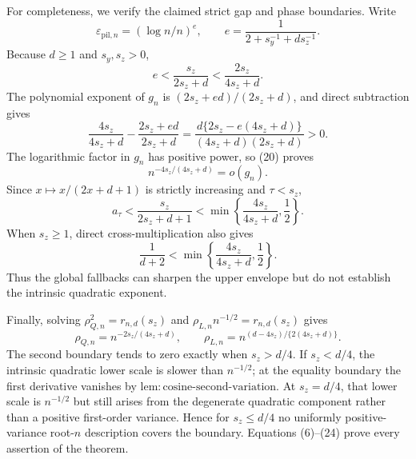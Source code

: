 For completeness, we verify the claimed strict gap and phase boundaries.  Write
\[
\varepsilon_{\mathrm{pil},n}=(\log n/n)^e,
\qquad
e=\frac{1}{2+s_y^{-1}+ds_z^{-1}}.
\]
Because \(d\ge1\) and \(s_y,s_z>0\),
\[
e<\frac{s_z}{2s_z+d}<\frac{2s_z}{4s_z+d}.                  \tag{19}
\]
The polynomial exponent of \(g_n\) is
\((2s_z+ed)/(2s_z+d)\), and direct subtraction gives
\[
\frac{4s_z}{4s_z+d}-\frac{2s_z+ed}{2s_z+d}
=\frac{d\{2s_z-e(4s_z+d)\}}
{(4s_z+d)(2s_z+d)}>0.                                       \tag{20}
\]
The logarithmic factor in \(g_n\) has positive power, so (20) proves
\[
n^{-4s_z/(4s_z+d)}=o(g_n).                                  \tag{21}
\]
Since \(x\mapsto x/(2x+d+1)\) is strictly increasing and \(\tau<s_z\),
\[
a_\tau<\frac{s_z}{2s_z+d+1}
<\min\left\{\frac{4s_z}{4s_z+d},\frac12\right\}.         \tag{22}
\]
When \(s_z\ge1\), direct cross-multiplication also gives
\[
\frac1{d+2}<\min\left\{\frac{4s_z}{4s_z+d},\frac12\right\}. \tag{23}
\]
Thus the global fallbacks can sharpen the upper envelope but do not establish the intrinsic quadratic exponent.

Finally, solving \(\rho_{Q,n}^2=r_{n,d}(s_z)\) and
\(\rho_{L,n}n^{-1/2}=r_{n,d}(s_z)\) gives
\[
\rho_{Q,n}=n^{-2s_z/(4s_z+d)},
\qquad
\rho_{L,n}=n^{(d-4s_z)/\{2(4s_z+d)\}}.                     \tag{24}
\]
The second boundary tends to zero exactly when \(s_z>d/4\).  If \(s_z<d/4\), the intrinsic quadratic lower scale is slower than \(n^{-1/2}\); at the equality boundary the first derivative vanishes by
\(\mathrm{lem{:}cosine\text{-}second\text{-}variation}\).  At \(s_z=d/4\), that lower scale is \(n^{-1/2}\) but still arises from the degenerate quadratic component rather than a positive first-order variance.  Hence for \(s_z\le d/4\) no uniformly positive-variance root-\(n\) description covers the boundary.  Equations (6)--(24) prove every assertion of the theorem.